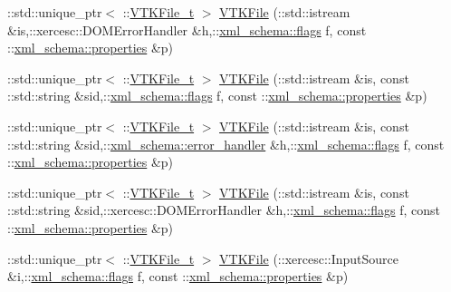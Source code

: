 \begin{DoxyCompactItemize}
\item 
\+::std\+::unique\+\_\+ptr$<$ \+::\hyperlink{classVTKFile__t}{V\+T\+K\+File\+\_\+t} $>$ \hyperlink{vtk-unstructured_8cpp_a50bb1ef8363f1e5f5dddc30db324fc61}{V\+T\+K\+File} (\+::std\+::istream \&is,\+::xercesc\+::\+D\+O\+M\+Error\+Handler \&h,\+::\hyperlink{namespacexml__schema_a0612287d030cb2732d31a45b258fdc87}{xml\+\_\+schema\+::flags} f, const \+::\hyperlink{namespacexml__schema_a1a8ebac679580b41baebd62c7d641c1d}{xml\+\_\+schema\+::properties} \&p)
\item 
\+::std\+::unique\+\_\+ptr$<$ \+::\hyperlink{classVTKFile__t}{V\+T\+K\+File\+\_\+t} $>$ \hyperlink{vtk-unstructured_8cpp_aed990627cca589fcd4097c0fec18afa5}{V\+T\+K\+File} (\+::std\+::istream \&is, const \+::std\+::string \&sid,\+::\hyperlink{namespacexml__schema_a0612287d030cb2732d31a45b258fdc87}{xml\+\_\+schema\+::flags} f, const \+::\hyperlink{namespacexml__schema_a1a8ebac679580b41baebd62c7d641c1d}{xml\+\_\+schema\+::properties} \&p)
\item 
\+::std\+::unique\+\_\+ptr$<$ \+::\hyperlink{classVTKFile__t}{V\+T\+K\+File\+\_\+t} $>$ \hyperlink{vtk-unstructured_8cpp_a1ed17d438cd94527354fc46ab87d8309}{V\+T\+K\+File} (\+::std\+::istream \&is, const \+::std\+::string \&sid,\+::\hyperlink{namespacexml__schema_a0a5d9528e9175cedf199984a8bb64d62}{xml\+\_\+schema\+::error\+\_\+handler} \&h,\+::\hyperlink{namespacexml__schema_a0612287d030cb2732d31a45b258fdc87}{xml\+\_\+schema\+::flags} f, const \+::\hyperlink{namespacexml__schema_a1a8ebac679580b41baebd62c7d641c1d}{xml\+\_\+schema\+::properties} \&p)
\item 
\+::std\+::unique\+\_\+ptr$<$ \+::\hyperlink{classVTKFile__t}{V\+T\+K\+File\+\_\+t} $>$ \hyperlink{vtk-unstructured_8cpp_a23aa086a56e887698a2d6a8cbf5a37a5}{V\+T\+K\+File} (\+::std\+::istream \&is, const \+::std\+::string \&sid,\+::xercesc\+::\+D\+O\+M\+Error\+Handler \&h,\+::\hyperlink{namespacexml__schema_a0612287d030cb2732d31a45b258fdc87}{xml\+\_\+schema\+::flags} f, const \+::\hyperlink{namespacexml__schema_a1a8ebac679580b41baebd62c7d641c1d}{xml\+\_\+schema\+::properties} \&p)
\item 
\+::std\+::unique\+\_\+ptr$<$ \+::\hyperlink{classVTKFile__t}{V\+T\+K\+File\+\_\+t} $>$ \hyperlink{vtk-unstructured_8cpp_af1614d51c76e60f3baa84ecd4debc345}{V\+T\+K\+File} (\+::xercesc\+::\+Input\+Source \&i,\+::\hyperlink{namespacexml__schema_a0612287d030cb2732d31a45b258fdc87}{xml\+\_\+schema\+::flags} f, const \+::\hyperlink{namespacexml__schema_a1a8ebac679580b41baebd62c7d641c1d}{xml\+\_\+schema\+::properties} \&p)
\item 

\end{DoxyCompactItemize}
